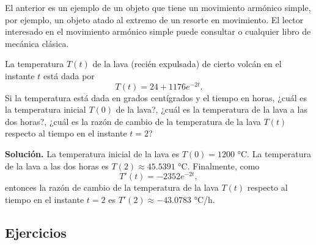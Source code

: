 \documentclass[12pt,a4paper]{book}
\begin{document}
    El anterior es un ejemplo de un objeto que tiene un movimiento armónico
    simple, por ejemplo, un objeto atado al extremo de un resorte en movimiento.
    El lector interesado en el movimiento armónico simple puede consultar \cite{nunez2020mecanica}
    o cualquier libro de mecánica clásica.

    \begin{ejemplo}\label{ejm:86}
        La temperatura $T(t)$ de la lava (recién
        expulsada) de cierto volcán en el instante $t$ está dada por
        \begin{equation*}
            T(t)=24+1176e^{-2t}.
        \end{equation*}
        Si la temperatura está dada en grados centígrados y el tiempo en horas, ¿cuál
        es la temperatura inicial $T(0)$ de la lava?, ¿cuál es la temperatura de la lava
        a las dos horas?, ¿cuál es la razón de cambio de la temperatura de la lava
        $T(t)$ respecto al tiempo en el instante $t=2$?

        \textbf{Solución.} La temperatura inicial de la lava es $T(0)=1200$ °C. La temperatura
        de la lava a las dos horas es $T(2)\approx 45.5391$ °C. Finalmente, como
        \begin{equation*}
            T'(t)=-2352e^{-2t},
        \end{equation*}
        entonces la razón de cambio de la temperatura de la lava $T(t)$ respecto al
        tiempo en el instante $t=2$ es $T'(2)\approx -43.0783$ °C/h.
    \end{ejemplo}

    \par{}\subsection*{Ejercicios}
\end{document}
